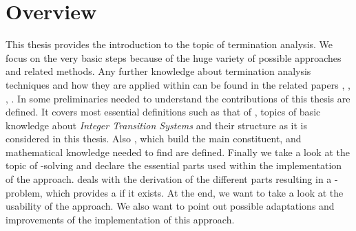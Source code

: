\section{Overview}
\label{sec:overview}
This thesis provides the introduction to the topic of termination analysis. We focus on the very basic steps because of the huge variety of possible approaches and related methods. Any further knowledge about termination analysis techniques and how they are applied within \aprove can be found in the related papers \cite{giesl2017analyzing}, \cite{giesl2006aprove}, \cite{DBLP:stroder}, \cite{giesl2003aprove}.\newline
In  some preliminaries needed to understand the contributions of this thesis are defined. It covers most essential definitions such as that of \nonterm, topics of basic knowledge about \textit{Integer Transition Systems} and their structure as it is considered in this thesis. Also \gnas, which build the main constituent, and mathematical knowledge needed to find \gnas are defined. Finally we take a look at the topic of -solving and declare the essential parts used within the implementation of the approach.\newline
{} deals with the derivation of the different parts resulting in a -problem, which provides a \gna if it exists. \newline
At the end, we want to take a look at the usability of the approach. We also want to point out possible adaptations and improvements of the implementation of this approach.